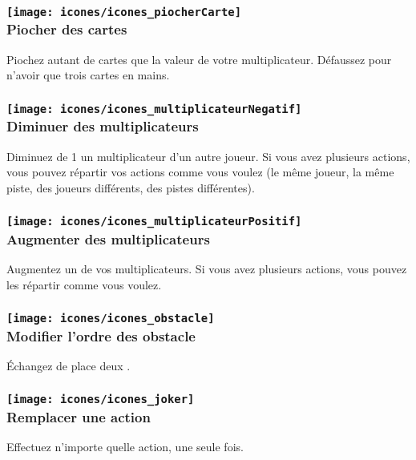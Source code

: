\subsubsection*{\texttt{[image: icones/icones\_piocherCarte]} \\ Piocher des cartes}
Piochez autant de cartes que la valeur de votre multiplicateur. Défaussez pour n'avoir que trois cartes en mains.

\subsubsection*{\texttt{[image: icones/icones\_multiplicateurNegatif]} \\ Diminuer des multiplicateurs}
Diminuez de 1 un multiplicateur d'un autre joueur. Si vous avez plusieurs actions, vous pouvez répartir vos actions comme vous voulez (le même joueur, la même piste, des joueurs différents, des pistes différentes).

\subsubsection*{\texttt{[image: icones/icones\_multiplicateurPositif]} \\ Augmenter des multiplicateurs}
Augmentez un de vos multiplicateurs. Si vous avez plusieurs actions, vous pouvez les répartir comme vous voulez.

\subsubsection*{\texttt{[image: icones/icones\_obstacle]} \\ Modifier l'ordre des obstacle}
Échangez de place deux \marqueursObstacles.

\subsubsection*{\texttt{[image: icones/icones\_joker]} \\ Remplacer une action}
Effectuez n'importe quelle action, une seule fois.